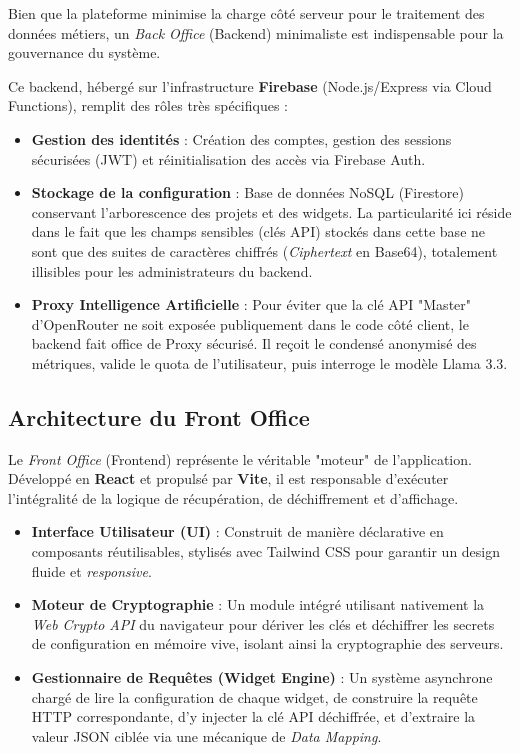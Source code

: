 ﻿\documentclass[12pt,a4paper,oneside]{report} %
\begin{document}
Bien que la plateforme minimise la charge côté serveur pour le traitement des données métiers, un \textit{Back Office} (Backend) minimaliste est indispensable pour la gouvernance du système.

Ce backend, hébergé sur l'infrastructure \textbf{Firebase} (Node.js/Express via Cloud Functions), remplit des rôles très spécifiques :
\begin{itemize}
    \item \textbf{Gestion des identités} : Création des comptes, gestion des sessions sécurisées (JWT) et réinitialisation des accès via Firebase Auth.
    \item \textbf{Stockage de la configuration} : Base de données NoSQL (Firestore) conservant l'arborescence des projets et des widgets. La particularité ici réside dans le fait que les champs sensibles (clés API) stockés dans cette base ne sont que des suites de caractères chiffrés (\textit{Ciphertext} en Base64), totalement illisibles pour les administrateurs du backend.
    \item \textbf{Proxy Intelligence Artificielle} : Pour éviter que la clé API "Master" d'OpenRouter ne soit exposée publiquement dans le code côté client, le backend fait office de Proxy sécurisé. Il reçoit le condensé anonymisé des métriques, valide le quota de l'utilisateur, puis interroge le modèle Llama 3.3.
\end{itemize}

\subsection{Architecture du Front Office}

Le \textit{Front Office} (Frontend) représente le véritable "moteur" de l'application. Développé en \textbf{React} et propulsé par \textbf{Vite}, il est responsable d'exécuter l'intégralité de la logique de récupération, de déchiffrement et d'affichage.

\begin{itemize}
    \item \textbf{Interface Utilisateur (UI)} : Construit de manière déclarative en composants réutilisables, stylisés avec Tailwind CSS pour garantir un design fluide et \textit{responsive}.
    \item \textbf{Moteur de Cryptographie} : Un module intégré utilisant nativement la \textit{Web Crypto API} du navigateur pour dériver les clés et déchiffrer les secrets de configuration en mémoire vive, isolant ainsi la cryptographie des serveurs.
    \item \textbf{Gestionnaire de Requêtes (Widget Engine)} : Un système asynchrone chargé de lire la configuration de chaque widget, de construire la requête HTTP correspondante, d'y injecter la clé API déchiffrée, et d'extraire la valeur JSON ciblée via une mécanique de \textit{Data Mapping}.
\end{itemize}
\end{document}
